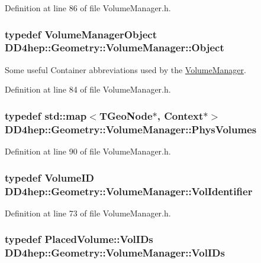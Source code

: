 Definition at line 86 of file VolumeManager.h.\hypertarget{class_d_d4hep_1_1_geometry_1_1_volume_manager_ac464fd441e5c72fb082e8cc6dd0937c4}{
\subsubsection[{Object}]{\setlength{\rightskip}{0pt plus 5cm}typedef {\bf VolumeManagerObject} {\bf DD4hep::Geometry::VolumeManager::Object}}}
\label{class_d_d4hep_1_1_geometry_1_1_volume_manager_ac464fd441e5c72fb082e8cc6dd0937c4}


Some useful Container abbreviations used by the \hyperlink{class_d_d4hep_1_1_geometry_1_1_volume_manager}{VolumeManager}. 

Definition at line 84 of file VolumeManager.h.\hypertarget{class_d_d4hep_1_1_geometry_1_1_volume_manager_a6dd3900be98a6b11d4c8ab7f59632f36}{
\subsubsection[{PhysVolumes}]{\setlength{\rightskip}{0pt plus 5cm}typedef std::map$<$TGeoNode$\ast$, {\bf Context}$\ast$$>$ {\bf DD4hep::Geometry::VolumeManager::PhysVolumes}}}
\label{class_d_d4hep_1_1_geometry_1_1_volume_manager_a6dd3900be98a6b11d4c8ab7f59632f36}


Definition at line 90 of file VolumeManager.h.\hypertarget{class_d_d4hep_1_1_geometry_1_1_volume_manager_a934cf07a47c6c2d9932aef080f789da8}{
\subsubsection[{VolIdentifier}]{\setlength{\rightskip}{0pt plus 5cm}typedef {\bf VolumeID} {\bf DD4hep::Geometry::VolumeManager::VolIdentifier}}}
\label{class_d_d4hep_1_1_geometry_1_1_volume_manager_a934cf07a47c6c2d9932aef080f789da8}


Definition at line 73 of file VolumeManager.h.\hypertarget{class_d_d4hep_1_1_geometry_1_1_volume_manager_a38763d6e830cf8e61ddd89d5416656eb}{
\subsubsection[{VolIDs}]{\setlength{\rightskip}{0pt plus 5cm}typedef {\bf PlacedVolume::VolIDs} {\bf DD4hep::Geometry::VolumeManager::VolIDs}}}
\label{class_d_d4hep_1_1_geometry_1_1_volume_manager_a38763d6e830cf8e61ddd89d5416656eb}


